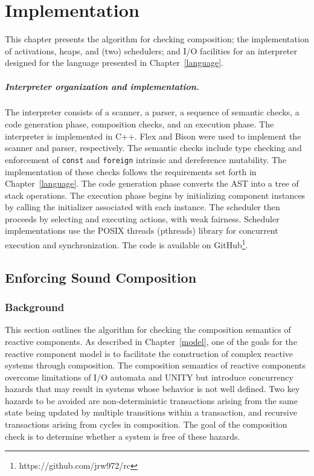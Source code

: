 \chapter{Implementation}
\label{implementation}

This chapter presents the algorithm for checking composition; the implementation of activations, heaps, and (two) schedulers; and I/O facilities for an interpreter designed for the language presented in Chapter~\ref{language}.

\paragraph{Interpreter organization and implementation.}
The interpreter consists of a scanner, a parser, a sequence of semantic checks, a code generation phase, composition checks, and an execution phase.
The interpreter is implemented in C++.
Flex and Bison were used to implement the scanner and parser, respectively.
The semantic checks include type checking and enforcement of \verb+const+ and \verb+foreign+ intrinsic and dereference mutability.
The implementation of these checks follows the requirements set forth in Chapter~\ref{language}.
The code generation phase converts the AST into a tree of stack operations.
The execution phase begins by initializing component instances by calling the initializer associated with each instance.
The scheduler then proceeds by selecting and executing actions, with weak fairness.
Scheduler implementations use the POSIX threads (pthreads) library for concurrent execution and synchronization.
The code is available on GitHub\footnote{https://github.com/jrw972/rc}.

\section{Enforcing Sound Composition}

\subsection{Background}

This section outlines the algorithm for checking the composition semantics of reactive components.
As described in Chapter~\ref{model}, one of the goals for the reactive component model is to facilitate the construction of complex reactive systems through composition.
The composition semantics of reactive components overcome limitations of I/O automata and UNITY but introduce concurrency hazards that may result in systems whose behavior is not well defined.
Two key hazards to be avoided are non-deterministic transactions arising from the same state being updated by multiple transitions within a transaction, and recursive transactions arising from cycles in composition.
The goal of the composition check is to determine whether a system is free of these hazards.

